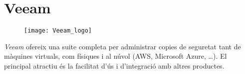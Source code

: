 
\section{Veeam}%
\label{sec:veeam}

\begin{figure}[H]
    \centering
    \texttt{[image: Veeam\_logo]}
\end{figure}

\emph{Veeam} ofereix una suite completa per administrar copies de seguretat
tant de màquines virtuals, com físiques i al núvol (AWS, Microsoft Azure,
\dots). El principal atractiu és la facilitat d'ús i d'integració amb altres
productes.
